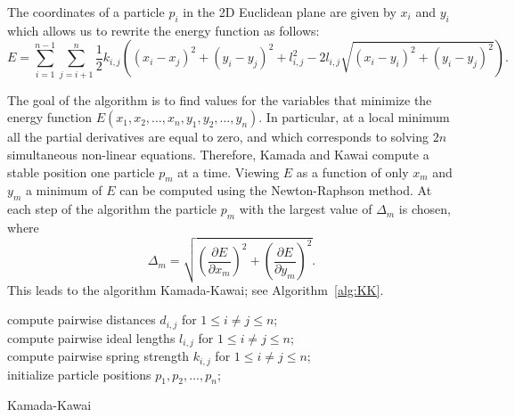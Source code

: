 \documentclass[notitlepage,letter,11pt]{article}
\begin{document}
The coordinates of a particle $p_i$ in the 2D Euclidean plane are given by $x_i$ and $y_i$ which allows us to rewrite the energy function as follows:
$$E=\sum_{i=1}^{n-1}\sum_{j=i+1}^{n}\frac{1}{2}k_{i,j}\left( (x_i-x_j)^2+(y_i-y_j)^2+l_{i,j}^2-2l_{i,j}\sqrt{(x_i-y_i)^2+(y_i-y_j)^2} \right).$$

The goal of the algorithm is to find values for the variables that
minimize the energy function $E(x_1, x_2, \dots, x_n, y_1, y_2, \dots, y_n)$. In
particular, at a local minimum all the partial derivatives are equal
to zero, and which corresponds to solving $2n$ simultaneous non-linear
equations. Therefore, Kamada and Kawai compute a stable position one
particle $p_m$ at a time. Viewing $E$ as a function of only $x_m$ and
$y_m$ a minimum of $E$ can be computed using the Newton-Raphson
method. At each step of the algorithm the particle $p_m$ with the largest value of $\Delta_m$ is chosen, where
$$\Delta_m=\sqrt{\left( \frac{\partial E}{\partial x_m}\right)^2+ \left( \frac{\partial E}{\partial y_m}\right)^2}.$$
This leads to the algorithm Kamada-Kawai; see Algorithm~\ref{alg:KK}.

\begin{algorithm}
compute pairwise distances $d_{i,j}$ for $1\leq i\neq j \leq n$;\\
compute pairwise ideal lengths $l_{i,j}$ for $1\leq i\neq j \leq n$;\\
compute pairwise spring strength $k_{i,j}$ for $1\leq i\neq j \leq n$;\\
initialize particle positions $p_1, p_2, \dots, p_n$;\\
\caption{Kamada-Kawai\label{alg:KK}}
\end{algorithm}
\end{document}
